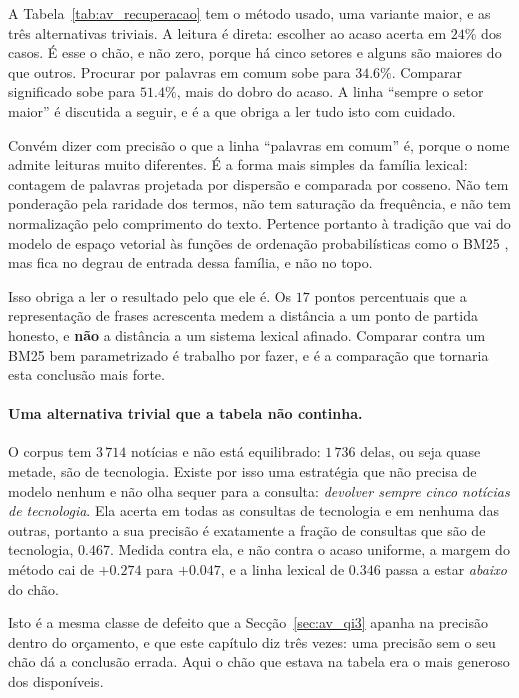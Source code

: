 A Tabela~\ref{tab:av_recuperacao} tem o método usado, uma variante maior, e as três alternativas
triviais. A leitura é direta: escolher ao acaso acerta em $24\%$ dos casos. É esse o chão, e não
zero, porque há cinco setores e alguns são maiores do que outros. Procurar por palavras em comum sobe para
$34.6\%$. Comparar significado sobe para $51.4\%$, mais do dobro do acaso. A linha
``sempre o setor maior'' é discutida a seguir, e é a que obriga a ler tudo isto com cuidado.

Convém dizer com precisão o que a linha ``palavras em comum'' é, porque o nome admite leituras muito
diferentes. É a forma mais simples da família lexical: contagem de palavras projetada por
dispersão e comparada por cosseno. Não tem ponderação pela raridade dos termos, não tem saturação da
frequência, e não tem normalização pelo comprimento do texto. Pertence portanto à tradição que vai do
modelo de espaço vetorial \autocite{salton1975vsm} às funções de ordenação probabilísticas como o
BM25 \autocite{robertson2009bm25}, mas fica no degrau de entrada dessa família, e não no topo.

Isso obriga a ler o resultado pelo que ele é. Os $17$ pontos percentuais que a representação de
frases \autocite{reimers2019sbert} acrescenta medem a distância a um ponto de partida honesto, e
\textbf{não} a distância a um sistema lexical afinado. Comparar contra um BM25 bem parametrizado é
trabalho por fazer, e é a comparação que tornaria esta conclusão mais forte.

\paragraph{Uma alternativa trivial que a tabela não continha.}
O corpus tem $3\,714$ notícias e não está equilibrado: $1\,736$ delas, ou seja quase metade, são de
tecnologia. Existe por isso uma estratégia que não precisa de modelo nenhum e não olha sequer para
a consulta: \emph{devolver sempre cinco notícias de tecnologia}. Ela acerta em todas as consultas
de tecnologia e em nenhuma das outras, portanto a sua precisão é exatamente a fração de consultas
que são de tecnologia, $0.467$. Medida contra ela, e não contra o acaso uniforme, a margem do
método cai de $+0.274$ para \textbf{$+0.047$}, e a linha lexical de $0.346$ passa a estar
\emph{abaixo} do chão.

Isto é a mesma classe de defeito que a Secção~\ref{sec:av_qi3} apanha na precisão dentro do
orçamento, e que este capítulo diz três vezes: uma precisão sem o seu chão dá a conclusão errada.
Aqui o chão que estava na tabela era o mais generoso dos disponíveis.


